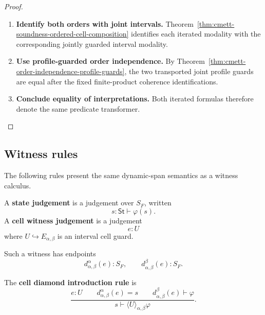 \begin{proof}
    \leavevmode
    \begin{enumerate}
        \item \textbf{Identify both orders with joint intervals.}
        Theorem~\ref{thm:cmett-soundness-ordered-cell-composition} identifies
        each iterated modality with the corresponding jointly guarded interval
        modality.

        \item \textbf{Use profile-guarded order independence.}
        By Theorem~\ref{thm:cmett-order-independence-profile-guards}, the two
        transported joint profile guards are equal after the fixed
        finite-product coherence identifications.

        \item \textbf{Conclude equality of interpretations.}
        Both iterated formulas therefore denote the same predicate
        transformer.
    \end{enumerate}
\end{proof}

\subsection{Witness rules}
\label{subsec:cmett-witness-rules}

The following rules present the same dynamic-span semantics as a witness
calculus.

\begin{definition}
\label{def:cmett-cell-witness-judgement}
    A \textbf{state judgement} is a judgement over \(S_F\), written
    \[
        s:\mathsf{St}\vdash \varphi(s).
    \]
    A \textbf{cell witness judgement} is a judgement
    \[
        e:U
    \]
    where \(U\hookrightarrow E_{\alpha,\beta}\) is an interval cell guard.
\end{definition}

Such a witness has endpoints
\[
    d_{\alpha,\beta}^{\alpha}(e):S_F,
    \qquad
    d_{\alpha,\beta}^{\beta}(e):S_F.
\]

\begin{definition}
\label{def:cmett-cell-diamond-introduction}
    The \textbf{cell diamond introduction rule} is
    \[
        \frac{
        e:U
        \qquad
        d_{\alpha,\beta}^{\alpha}(e)=s
        \qquad
        d_{\alpha,\beta}^{\beta}(e)\vdash\varphi
        }{
        s\vdash\langle U\rangle_{\alpha,\beta}\varphi
        }.
    \]
\end{definition}

